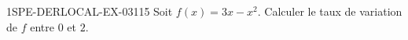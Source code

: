 \begin{exercice}{1SPE-DERLOCAL-EX-031}{1}{5}
Soit $f(x)=3x-x^2$. Calculer le taux de variation de $f$ entre $0$ et $2$.
\end{exercice}
